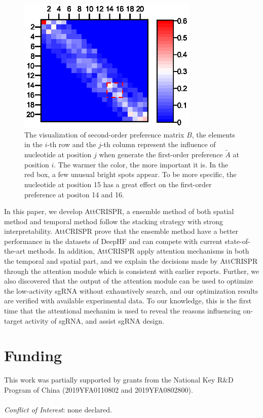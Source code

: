 \documentclass{bioinfo}
\begin{document}
\begin{figure}[!tpb]
    \centerline{\includegraphics[width=86mm]{secondorder.eps}}
    \caption{The visualization of second-order preference matrix $B$, 
the elements in the $i$-th row and the $j$-th column represent the influence of nucleotide at position $j$ when generate the first-order preference $\tilde{A}$ at position $i$. 
The warmer the color, the more important it is. 
In the red box, a few unusual bright spots appear. 
To be more specific, the nucleotide at position 15 has a great effect on the first-order preference at positon 14 and 16.
}\label{fig:heatmap}
\end{figure}
In this paper, we develop AttCRISPR, a ensemble method of both spatial method and temporal method follow the stacking strategy with strong interpretability. 
AttCRISPR prove that the ensemble method have a better performance in the datasets of DeepHF
and can compete with current state-of-the-art methods. 
In addition, AttCRISPR apply attention mechanisms in both the temporal and spatial part, 
and we explain the decisions made by AttCRISPR through the attention module which is consistent with earlier reports. 
Further, we also discovered that the output of the attention module can be used to optimize the low-activity sgRNA without exhaustively search, 
and our optimization results are verified with available experimental data. 
To our knowledge, this is the first time that the attentional mechanim is used to reveal the reasons influencing on-target activity of sgRNA, and assist sgRNA design.  


\section*{Funding}

This work was partially supported by grants from the National Key R\&D Program of China (2019YFA0110802 and 2019YFA0802800).
\\\\\emph{Conflict of Interest}: none declared.\vspace*{-12pt}



\end{document}
